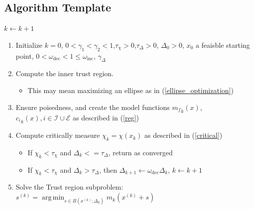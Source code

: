 \documentclass{article}
\DeclareMathOperator*{\argmin}{arg\,min}
\let\oldref\ref
\renewcommand{\ref}[1]{(\oldref{#1})}
\begin{document}
\subsection{Algorithm Template}



$k \leftarrow k + 1$


\begin{enumerate}
    \item Initialize $k=0$, $0<\gamma_1<\gamma_2<1$,$\tau_{\chi}>0$,$\tau_{\Delta}>0$, $\Delta_0 > 0$, $x_0$ a feaisble starting point, $0<\omega_{\text{dec}} < 1 \le \omega_{\text{inc}}$, $\gamma_{\Delta}$
    \item Compute the inner trust region.
    \begin{itemize}
        \item This may mean maximizing an ellipse as in \ref{ellipse_optimization}
    \end{itemize}
	\item Ensure poisedness, and create the model functions ${m_f}_k(x)$, ${c_i}_k(x), i \in \mathcal I \cup \mathcal E$ as described in \ref{reg}
	\item Compute critically measure $\chi_k = \chi(x_k)$ as described in \ref{critical}
    \begin{itemize}
        \item If $\chi_k < \tau_{\chi}$ and $\Delta_k <= \tau_{\Delta}$, return as converged
        \item If $\chi_k < \tau_{\chi}$ and $\Delta_k > \tau_{\Delta}$, then $\Delta_{k+1} \leftarrow \omega_{\text{dec}} \Delta_k$, $k \leftarrow k + 1$
    \end{itemize}
	
	\item Solve the Trust region subproblem: $s^{(k)} = \argmin_{s\in B(x^{(k)};\Delta_k)} m_k(x^{(k)} + s)$
	\begin {itemize}
	\end{itemize}
	

\end{enumerate}
\end{document}
